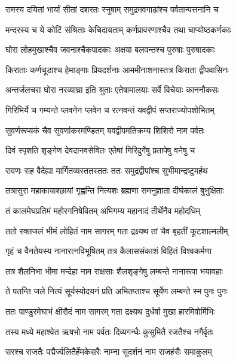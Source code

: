 \twolineshloka
{रामस्य दयितां भार्यां सीतां दशरतः स्नुषाम्}
{समुद्रमवगाढांश्च पर्वतान्पत्तनानि च} %

\twolineshloka
{मन्दरस्य च ये कोटिं संश्रिताः केचिदायताम्}
{कर्णप्रावरणाश्चैव तथा चाप्योष्ठकर्णकाः} %

\twolineshloka
{घोरा लोहमुखाश्चैव जवनाश्चैकपादकाः}
{अक्षया बलवन्तश्च पुरुषाः पुरुषादकाः} %

\twolineshloka
{किराताः कर्णचूडाश्च हेमाङ्गाः प्रियदर्शनाः}
{आममीनाशनास्तत्र किराता द्वीपवासिनः} %

\twolineshloka
{अन्तर्जलचरा घोरा नरव्याघ्रा इति श्रुताः}
{एतेषामालयाः सर्वे विचेयाः काननौकसः} %

\twolineshloka
{गिरिभिर्ये च गम्यन्ते प्लवनेन प्लवेन च}
{रत्नवन्तं यवद्वीपं सप्तराज्योपशोभितम्} %

\twolineshloka
{सुवर्णरूप्यकं चैव सुवर्णाकरमण्डितम्}
{यवद्वीपमतिक्रम्य शिशिरो नाम पर्वतः} %

\twolineshloka
{दिवं स्पृशति शृङ्गेण देवदानवसेवितः}
{एतेषां गिरिदुर्गेषु प्रतापेषु वनेषु च} %

\twolineshloka
{रावणः सह वैदेह्या मार्गितव्यस्ततस्ततः}
{ततः समुद्रद्वीपांश्च सुभीमान्द्रष्टुमर्हथ} %

\twolineshloka
{तत्रासुरा महाकायाश्छायां गृह्णन्ति नित्यशः}
{ब्रह्मणा समनुज्ञाता दीर्घकालं बुभुक्षिताः} %

\twolineshloka
{तं कालमेघप्रतिमं महोरगनिषेवितम्}
{अभिगम्य महानादं तीर्थेनैव महोदधिम्} %

\twolineshloka
{ततो रक्तजलं भीमं लोहितं नाम सागरम्}
{गता द्रक्ष्यथ तां चैव बृहतीं कूटशाल्मलीम्} %

\twolineshloka
{गृहं च वैनतेयस्य नानारत्नविभूषितम्}
{तत्र कैलाससंकाशं विहितं विश्वकर्मणा} %

\twolineshloka
{तत्र शैलनिभा भीमा मन्देहा नाम राक्षसाः}
{शैलशृङ्गेषु लम्बन्ते नानारूपा भयावहाः} %

\twolineshloka
{ते पतन्ति जले नित्यं सूर्यस्योदयनं प्रति}
{अभितप्ताश्च सूर्येण लम्बन्ते स्म पुनः पुनः} %

\twolineshloka
{ततः पाण्डुरमेघाभं क्षीरौदं नाम सागरम्}
{गता द्रक्ष्यथ दुर्धर्षा मुखा हारमिवोर्मिभिः} %

\twolineshloka
{तस्य मध्ये महाश्वेत ऋषभो नाम पर्वतः}
{दिव्यगन्धैः कुसुमितै रजतैश्च नगैर्वृतः} %

\twolineshloka
{सरश्च राजतैः पद्मैर्ज्वलितैर्हेमकेसरैः}
{नाम्ना सुदर्शनं नाम राजहंसैः समाकुलम्} %

